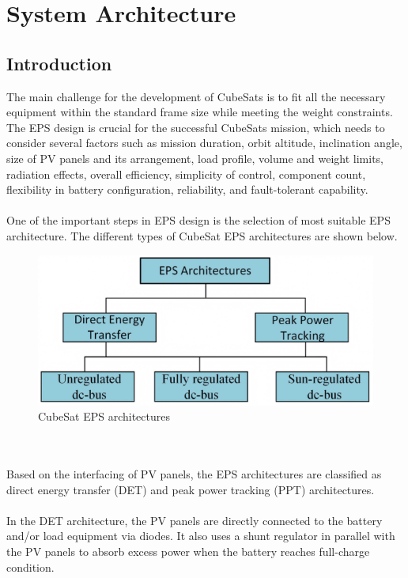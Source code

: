\chapter{System Architecture}
\section[Introduction]{Introduction}

The main challenge for the development of CubeSats is to fit all the necessary equipment within the standard frame size while meeting the weight constraints. The EPS design is crucial for the successful CubeSats mission, which needs to consider several factors such as mission duration, orbit altitude, inclination angle, size of PV panels and its arrangement, load profile, volume and weight limits, radiation effects, overall efficiency, simplicity of control, component count, flexibility in battery configuration, reliability, and fault-tolerant capability. 
\\ \\
One of the important steps in EPS design is the selection of most suitable EPS architecture. The different types of CubeSat EPS architectures are shown below.
\\ 
\begin{figure}[H]
	\centering
	\includegraphics[width=0.7\columnwidth]{IMGS/EPSarchitectures.jpg}
	\caption{CubeSat EPS architectures}
	\label{fig:arch}
\end{figure} 
\\ \\
Based on the interfacing of PV panels, the EPS architectures are classified as direct energy transfer (DET) and peak power tracking (PPT) architectures. 
\\ \\
In the DET architecture, the PV panels are directly connected to the battery and/or load equipment via diodes. It also uses a shunt regulator in parallel with the PV panels to absorb excess power when the battery reaches full-charge condition.
\\ \\
